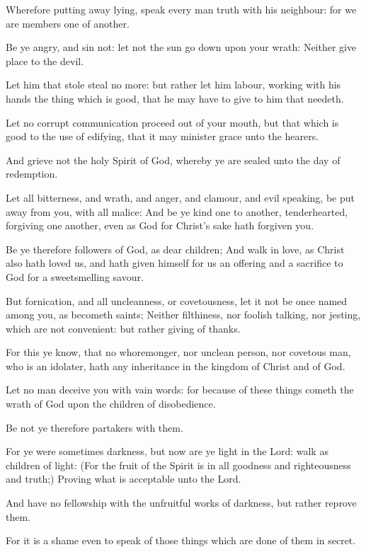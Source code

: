 \Verse Wherefore putting away lying, speak every man truth with his neighbour: for we are members one of another.

\Verse Be ye angry, and sin not: let not the sun go down upon your wrath: \Verse Neither give place to the devil.

\Verse Let him that stole steal no more: but rather let him labour, working with his hands the thing which is good, that he may have to give to him that needeth.

\Verse Let no corrupt communication proceed out of your mouth, but that which is good to the use of edifying, that it may minister grace unto the hearers.

\Verse And grieve not the holy Spirit of God, whereby ye are sealed unto the day of redemption.

\Verse Let all bitterness, and wrath, and anger, and clamour, and evil speaking, be put away from you, with all malice: \Verse And be ye kind one to another, tenderhearted, forgiving one another, even as God for Christ's sake hath forgiven you.


\Chapter
\Verse Be ye therefore followers of God, as dear children; \Verse And walk in love, as Christ also hath loved us, and hath given himself for us an offering and a sacrifice to God for a sweetsmelling savour.

\Verse But fornication, and all uncleanness, or covetousness, let it not be once named among you, as becometh saints; \Verse Neither filthiness, nor foolish talking, nor jesting, which are not convenient: but rather giving of thanks.

\Verse For this ye know, that no whoremonger, nor unclean person, nor covetous man, who is an idolater, hath any inheritance in the kingdom of Christ and of God.

\Verse Let no man deceive you with vain words: for because of these things cometh the wrath of God upon the children of disobedience.

\Verse Be not ye therefore partakers with them.

\Verse For ye were sometimes darkness, but now are ye light in the Lord: walk as children of light: \Verse (For the fruit of the Spirit is in all goodness and righteousness and truth;) \Verse Proving what is acceptable unto the Lord.

\Verse And have no fellowship with the unfruitful works of darkness, but rather reprove them.

\Verse For it is a shame even to speak of those things which are done of them in secret.

